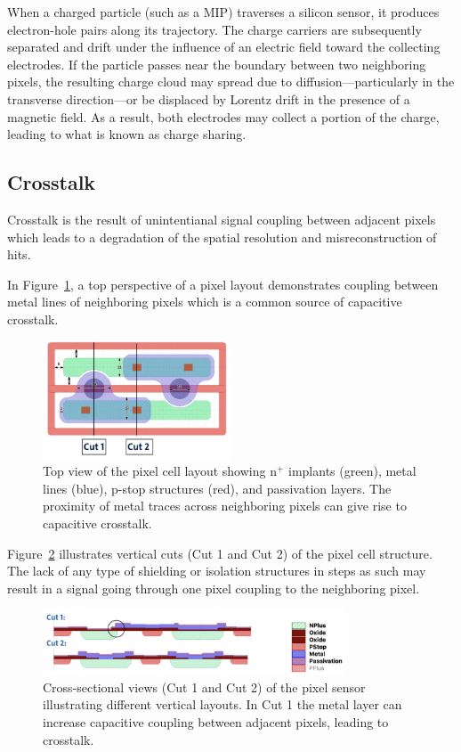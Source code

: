 When a charged particle (such as a MIP) traverses a silicon sensor, it produces electron-hole pairs along its trajectory. The charge carriers are subsequently separated and drift under the influence of an electric field toward the collecting electrodes. If the particle passes near the boundary between two neighboring pixels, the resulting charge cloud may spread due to diffusion—particularly in the transverse direction—or be displaced by Lorentz drift in the presence of a magnetic field. As a result, both electrodes may collect a portion of the charge, leading to what is known as charge sharing.

\subsection{Crosstalk}

Crosstalk is the result of unintentianal signal coupling between adjacent pixels which leads to a degradation of the spatial resolution and misreconstruction of hits.

In Figure~\ref{fig:xtalk_layout}, a top perspective of a pixel layout demonstrates coupling between metal lines of neighboring pixels which is a common source of capacitive crosstalk.

\begin{figure}[H]
    \centering
    \includegraphics[width=0.5\textwidth]{images/RH0017.png}
    \caption{Top view of the pixel cell layout showing n$^+$ implants (green), metal lines (blue), p-stop structures (red), and passivation layers. The proximity of metal traces across neighboring pixels can give rise to capacitive crosstalk.}
    \label{fig:xtalk_layout}
\end{figure}

Figure~\ref{fig:xtalk_cut} illustrates vertical cuts (Cut 1 and Cut 2) of the pixel cell structure. The lack of any type of shielding or isolation structures in steps as such may result in a signal going through one pixel coupling to the neighboring pixel.

\begin{figure}[H]
    \centering
    \includegraphics[width=0.8\textwidth]{images/RH0017cut.png}
    \caption{Cross-sectional views (Cut 1 and Cut 2) of the pixel sensor illustrating different vertical layouts. In Cut 1 the metal layer can increase capacitive coupling between adjacent pixels, leading to crosstalk.}
    \label{fig:xtalk_cut}
\end{figure}

